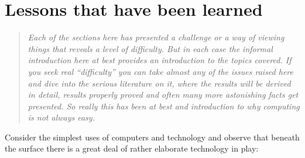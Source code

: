 \section{Lessons that have been learned}
\begin{quotation}\textit{
Each of the sections here has presented a challenge or a way of viewing things
that reveals a level of difficulty. But in each case the informal
introduction here at best provides an introduction to the topics covered.
If you seek real ``difficulty'' you can take almost any of the
issues raised here and dive into the serious literature on it, where the
results will be derived in detail, results properly proved and often
many more astonishing facts get presented. So really this has been at
best and introduction to why computing is not always easy. 
}\end{quotation}
Consider the simplest uses of computers and technology and observe that
beneath the surface there is a great deal of rather elaborate technology
in play:
